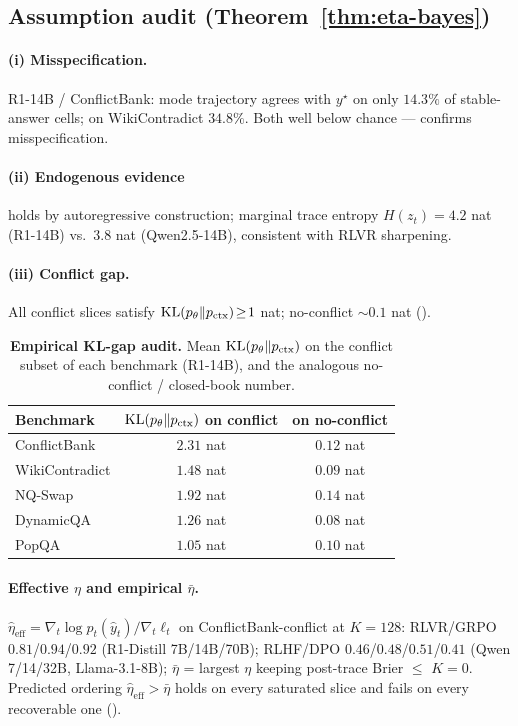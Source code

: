 \subsection{Assumption audit (Theorem~\ref{thm:eta-bayes})}
\label{app:assumption-audit}

\paragraph{(i) Misspecification.} R1-14B / ConflictBank: mode trajectory
agrees with $y^\star$ on only $14.3\%$ of stable-answer cells; on
WikiContradict $34.8\%$.  Both well below chance — confirms
misspecification.
\paragraph{(ii) Endogenous evidence} holds by autoregressive
construction; marginal trace entropy $H(z_t)\!=\!4.2$ nat (R1-14B)
vs.\ $3.8$ nat (Qwen2.5-14B), consistent with RLVR sharpening.
\paragraph{(iii) Conflict gap.}  All conflict slices satisfy
$\operatorname{KL}(p_\theta\|p_{\mathrm{ctx}})\!\ge\!1$ nat; no-conflict $\sim\!0.1$ nat
().

\begin{table}[H]
\centering\small
\caption{\textbf{Empirical KL-gap audit.}  Mean $\operatorname{KL}(p_\theta\|p_{\mathrm{ctx}})$ on
the conflict subset of each benchmark (R1-14B), and the analogous
no-conflict / closed-book number.}
\label{tab:kl-gap}
\begin{tabular}{lcc}
\toprule
\textbf{Benchmark} & $\operatorname{KL}(p_\theta\|p_{\mathrm{ctx}})$ on conflict & on no-conflict\\
\midrule
ConflictBank      & $2.31$ nat & $0.12$ nat\\
WikiContradict    & $1.48$ nat & $0.09$ nat\\
NQ-Swap           & $1.92$ nat & $0.14$ nat\\
DynamicQA         & $1.26$ nat & $0.08$ nat\\
PopQA             & $1.05$ nat & $0.10$ nat\\
\bottomrule
\end{tabular}
\end{table}

\paragraph{Effective $\eta$ and empirical $\bar\eta$.}
$\widehat\eta_{\mathrm{eff}}\!=\!\nabla_t\log p_t(\hat y_t)/\nabla_t\ell_t$
on ConflictBank-conflict at $K\!=\!128$: RLVR/GRPO $0.81$/$0.94$/$0.92$
(R1-Distill 7B/14B/70B); RLHF/DPO $0.46$/$0.48$/$0.51$/$0.41$
(Qwen 7/14/32B, Llama-3.1-8B); $\bar\eta$ = largest $\eta$ keeping
post-trace Brier $\le$ $K\!=\!0$.  Predicted ordering
$\widehat\eta_{\mathrm{eff}}\!>\!\bar\eta$ holds on every saturated
slice and fails on every recoverable one ().


